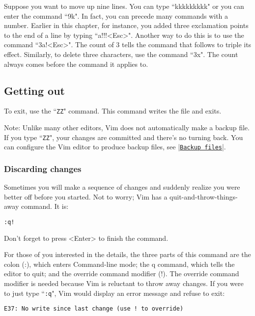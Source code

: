 Suppose you want to move up nine lines.
You can type ``kkkkkkkkk" or you can enter the command ``9k".
In fact, you can precede many commands with a number.
Earlier in this chapter, for instance, you added three exclamation points to the end of a line by typing ``a!!!<Esc>".
Another way to do this is to use the command ``3a!<Esc>".
The count of 3 tells the command that follows to triple its effect.
Similarly, to delete three characters, use the command ``3x".
The count always comes before the command it applies to.

\subsection{Getting out}

To exit, use the ``\texttt{ZZ}" command.  This command writes the file and exits.

Note:\newline
Unlike many other editors, Vim does not automatically make a backup file.
If you type ``\texttt{ZZ}", your changes are committed and there's no turning back.
You can configure the Vim editor to produce backup files, see |\hyperref[Backup files]{\texttt{Backup files}}|.

\subsubsection{Discarding changes}

Sometimes you will make a sequence of changes and suddenly realize you were better off before you started.
Not to worry; Vim has a quit-and-throw-things-away command.
It is:

	\begin{Verbatim}[samepage=true]
	:q!
	\end{Verbatim}

Don't forget to press <Enter> to finish the command.

For those of you interested in the details, the three parts of this command are the colon (:), which enters Command-line mode; the q command, which tells the editor to quit; and the override command modifier (!).
The override command modifier is needed because Vim is reluctant to throw away changes.
If you were to just type ``\texttt{:q}", Vim would display an error message and refuse to exit:

		\begin{Verbatim}[samepage=true]
    E37: No write since last change (use ! to override)
		\end{Verbatim}

